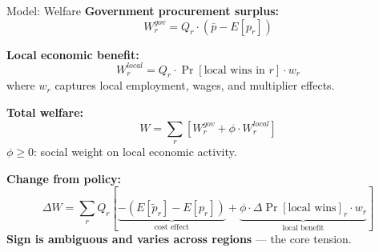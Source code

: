 \documentclass[9pt,aspectratio=169]{beamer}
\begin{document}
\begin{frame}{Model: Welfare}
\textbf{Government procurement surplus:}
\[
  W_r^{gov} = Q_r \cdot \left(\bar{p} - E[p_r]\right)
\]

\textbf{Local economic benefit:}
\[
  W_r^{local} = Q_r \cdot \Pr[\text{local wins in } r] \cdot w_r
\]
where $w_r$ captures local employment, wages, and multiplier effects.

\textbf{Total welfare:}
\[
  W = \sum_{r} \left[W_r^{gov} + \phi \cdot W_r^{local}\right]
\]
$\phi \geq 0$: social weight on local economic activity.

\textbf{Change from policy:}
\[
  \Delta W = \sum_r Q_r
    \left[
      \underbrace{-(E[\tilde{p}_r] - E[p_r])}_{\text{cost effect}}
      + \underbrace{\phi \cdot \Delta\!\Pr[\text{local wins}]_r \cdot w_r}_{\text{local benefit}}
    \right]
\]
\textbf{Sign is ambiguous and varies across regions} --- the core tension.
\end{frame}
\end{document}
